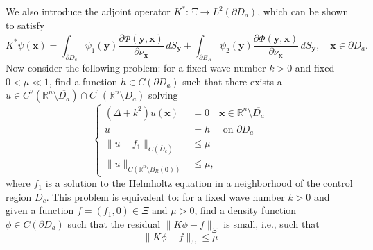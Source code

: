\documentclass[11pt]{amsart}
\theoremstyle{definition}
\theoremstyle{definition}
\theoremstyle{definition}
\begin{document}
We also introduce the adjoint operator $K^{*}: \Xi \to L^{2}(\partial D_{a})$, which can be shown to satisfy
\begin{equation}
K^{*}\psi(\mathbf{x}) = \int_{\partial D_{c}} \psi_{1}(\mathbf{y}) \overline{\frac{\partial \Phi(\mathbf{y},\mathbf{x})}{\partial \nu_{\mathbf{x}}}}\,dS_{\mathbf{y}} + \int_{\partial B_{R}} \psi_{2}(\mathbf{y}) \overline{\frac{\partial \Phi(\mathbf{y},\mathbf{x})}{\partial \nu_{\mathbf{x}}}}\, dS_{\mathbf{y}}, \quad \mathbf{x} \in \partial D_{a}. \label{eq:dlpotentialadjoint}
\end{equation}
Now consider the following problem: for a fixed wave number $k > 0$ and fixed $0 < \mu \ll 1$, find a function $h \in C(\partial D_{a})$ such that there exists a $u \in C^{2}(\mathbb{R}^{n} \setminus \overline{D_{a}}) \cap C^{1}(\mathbb{R}^{n} \setminus D_{a})$ solving
\begin{equation}
\left\{ \begin{array}{rl}
(\Delta + k^{2}) u(\mathbf{x}) & = 0 \quad \mathbf{x} \in \mathbb{R}^{n} \setminus \overline{D_{a}}\\
u & = h \quad \textrm{ on $\partial D_{a}$}\\
\|u - f_{1}\|_{C(\overline{D}_{c})} & \leq \mu \\
\|u\|_{C(\mathbb{R}^{n} \setminus B_{R}(\mathbf{0}))} & \leq \mu,
\end{array}
\right. \label{eq:inverseproblem}
\end{equation}
where $f_{1}$ is a solution to the Helmholtz equation in a neighborhood of the control region $D_{c}$. This problem is equivalent to: for a fixed wave number $k>0$ and given a function $f=(f_1,0) \in \Xi$ and $\mu > 0$, find a density function $\phi \in C(\partial D_{a})$ such that the residual $\|K\phi - f\|_{\Xi} $ is small, i.e., such that
\begin{equation}
\|K\phi - f\|_{\Xi} \leq \mu \label{eq:controlinequality}
\end{equation} 
\end{document}

